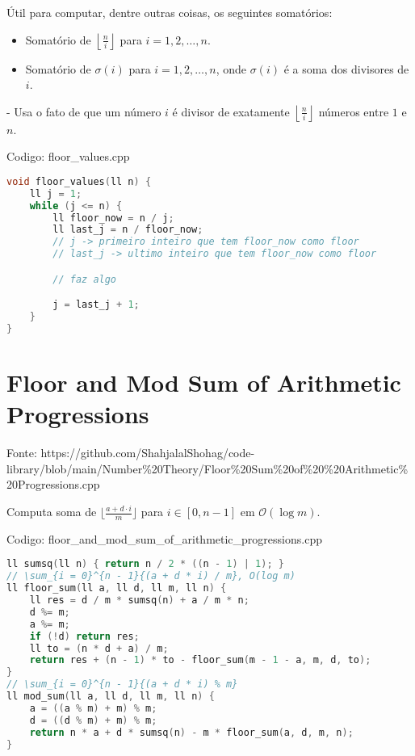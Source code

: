 \documentclass[10pt, a4paper, oneside]{book}
\begin{document}
Útil para computar, dentre outras coisas, os seguintes somatórios:



\begin{itemize}
\item Somatório de $\left\lfloor \frac{n}{i} \right\rfloor$ para $i = 1, 2, \ldots, n$.
\end{itemize}



\begin{itemize}
\item Somatório de $\sigma(i)$ para $i = 1, 2, \ldots, n$, onde $\sigma(i)$ é a soma dos divisores de $i$.
\end{itemize}

    - Usa o fato de que um número $i$ é divisor de exatamente $\left\lfloor \frac{n}{i} \right\rfloor$ números entre $1$ e $n$.
\hfill

Codigo: floor\_values.cpp

\begin{lstlisting}[language=C++]
void floor_values(ll n) {
    ll j = 1;
    while (j <= n) {
        ll floor_now = n / j;
        ll last_j = n / floor_now;
        // j -> primeiro inteiro que tem floor_now como floor
        // last_j -> ultimo inteiro que tem floor_now como floor

        // faz algo

        j = last_j + 1;
    }
}
\end{lstlisting}
\hfill

\section{Floor and Mod Sum of Arithmetic Progressions}


Fonte: https://github.com/ShahjalalShohag/code-library/blob/main/Number\%20Theory/Floor\%20Sum\%20of\%20\%20Arithmetic\%20Progressions.cpp



Computa soma de $\bigl\lfloor \frac{a + d\cdot i}{m} \bigr\rfloor$ para $i \in [0, n-1]$ em $\mathcal{O}(\log{m})$.

\hfill

Codigo: floor\_and\_mod\_sum\_of\_arithmetic\_progressions.cpp

\begin{lstlisting}[language=C++]
ll sumsq(ll n) { return n / 2 * ((n - 1) | 1); }
// \sum_{i = 0}^{n - 1}{(a + d * i) / m}, O(log m)
ll floor_sum(ll a, ll d, ll m, ll n) {
    ll res = d / m * sumsq(n) + a / m * n;
    d %= m;
    a %= m;
    if (!d) return res;
    ll to = (n * d + a) / m;
    return res + (n - 1) * to - floor_sum(m - 1 - a, m, d, to);
}
// \sum_{i = 0}^{n - 1}{(a + d * i) % m}
ll mod_sum(ll a, ll d, ll m, ll n) {
    a = ((a % m) + m) % m;
    d = ((d % m) + m) % m;
    return n * a + d * sumsq(n) - m * floor_sum(a, d, m, n);
}
\end{lstlisting}
\hfill
\end{document}
